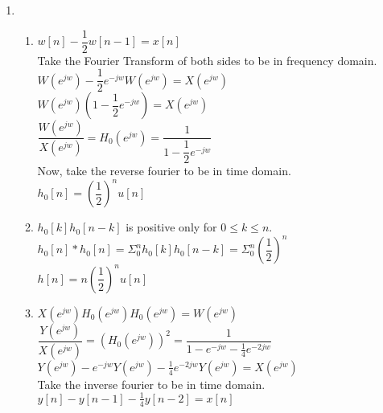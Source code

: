 \documentclass[10pt,a4paper, margin=1in]{article}
\begin{document}
\begin{enumerate}
\item %
    \begin{enumerate}
    \item %
    $ w[n]-\dfrac{1}{2}w[n-1]=x[n] $\\
    Take the Fourier Transform of both sides to be in frequency domain.\\
    $ W(e^{jw})-\dfrac{1}{2}e^{-jw}W(e^{jw})=X(e^{jw}) $\\
    $ W(e^{jw})(1-\dfrac{1}{2}e^{-jw})=X(e^{jw}) $\\
    $\dfrac{W(e^{jw})}{X(e^{jw})}=H_0(e^{jw})=\dfrac{1}{1-\dfrac{1}{2}e^{-jw}}$\\
    Now, take the reverse fourier to be in time domain.\\
    $ h_0[n]=(\dfrac{1}{2})^nu[n] $
    \item %
    $ h_0[k]h_0[n-k] $ is positive only for $0\leq k \leq n$. \\
    $ h_0[n] \ast h_0[n]=\Sigma_0^n h_0[k]h_0[n-k]=\Sigma_0^n(\dfrac{1}{2})^n $\\
    $ h[n]=n(\dfrac{1}{2})^nu[n]$
    \item %
    $ X(e^{jw})H_0(e^{jw})H_0(e^{jw})= W(e^{jw})$\\
    $ \dfrac{Y(e^{jw})}{X(e^{jw})} = (H_0(e^{jw}))^2 = \dfrac{1}{1-e^{-jw}-\frac{1}{4}e^{-2jw}} $\\
    $ Y(e^{jw})-e^{-jw}Y(e^{jw})-\frac{1}{4}e^{-2jw}Y(e^{jw}) = X(e^{jw}) $\\
    Take the inverse fourier to be in time domain.\\
    $ y[n]-y[n-1]-\frac{1}{4}y[n-2]=x[n] $
    \end{enumerate}

\end{enumerate}
\end{document}
